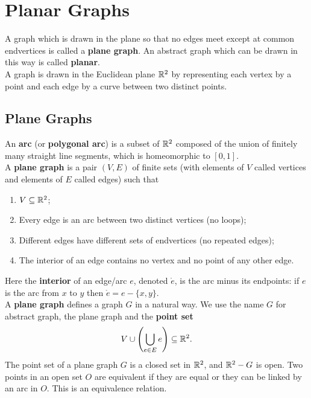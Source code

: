 \chapter{Planar Graphs}

A graph which is drawn in the plane so that no edges meet except at common endvertices is called a \textbf{plane graph}. An abstract graph which can be drawn in this way is called \textbf{planar}. \\

A graph is drawn in the Euclidean plane \(\mathbb{R}^2\) by representing each vertex by a point and each edge by a curve between two distinct points.

\section{Plane Graphs}

An \textbf{arc} (or \textbf{polygonal arc}) is a subset of \(\mathbb{R}^2\) composed of the union of finitely many straight line segments, which is homeomorphic to \([0, 1]\). \\

A \textbf{plane graph} is a pair \((V, E)\) of finite sets (with elements of \(V\) called vertices and elements of \(E\) called edges) such that
\begin{enumerate}[label=(\roman*)]
    \item \(V \subseteq \mathbb{R}^2\);
    \item Every edge is an arc between two distinct vertices (no loops);
    \item Different edges have different sets of endvertices (no repeated edges);
    \item The interior of an edge contains no vertex and no point of any other edge.
\end{enumerate}

Here the \textbf{interior} of an edge/arc \(e\), denoted \(\mathring{e}\), is the arc minus its endpoints: if \(e\) is the arc from \(x\) to \(y\) then \(\mathring{e} = e - \{x, y\}\). \\

A \textbf{plane graph} defines a graph \(G\) in a natural way. We use the name \(G\) for abstract graph, the plane graph and the \textbf{point set}
\[V \cup \left(\bigcup_{e \in E} e\right) \subseteq \mathbb{R}^2.\]
The point set of a plane graph \(G\) is a closed set in \(\mathbb{R}^2\), and \(\mathbb{R}^2 - G\) is open. Two points in an open set \(O\) are equivalent if they are equal or they can be linked by an arc in \(O\). This is an equivalence relation. \\

